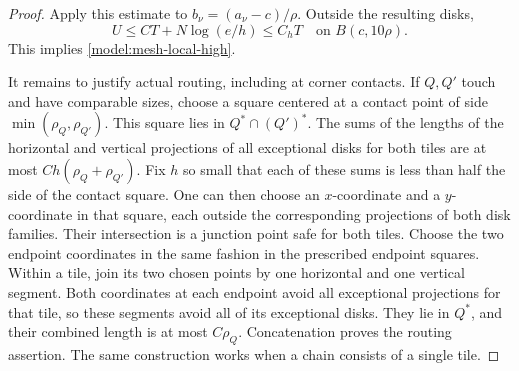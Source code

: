\begin{proof}
Apply this estimate to \(b_\nu=(a_\nu-c)/\rho\).  Outside the
resulting disks,
\[
 U\le CT+N\log(e/h)\le C_hT
 \quad\text{on }B(c,10\rho).
\]
This implies \eqref{model:mesh-local-high}.

It remains to justify actual routing, including at corner contacts.
If \(Q,Q'\) touch and have comparable sizes, choose a square centered
at a contact point of side \(\min(\rho_Q,\rho_{Q'})\).  This square
lies in \(Q^*\cap(Q')^*\).  The sums of the lengths of the horizontal
and vertical projections of all exceptional disks for both tiles are
at most \(C h(\rho_Q+\rho_{Q'})\).  Fix \(h\) so small that each of
these sums is less than half the side of the contact square.  One can
then choose an \(x\)-coordinate and a \(y\)-coordinate in that square,
each outside the corresponding projections of both disk families.
Their intersection is a junction point safe for both tiles.  Choose
the two endpoint coordinates in the same fashion in the prescribed
endpoint squares.  Within a tile, join its two chosen points by one
horizontal and one vertical segment.  Both coordinates at each endpoint
avoid all exceptional projections for that tile, so these segments
avoid all of its exceptional disks.  They lie in \(Q^*\), and their
combined length is at most \(C\rho_Q\).  Concatenation proves the
routing assertion.  The same construction works when a chain consists
of a single tile.
\end{proof}

